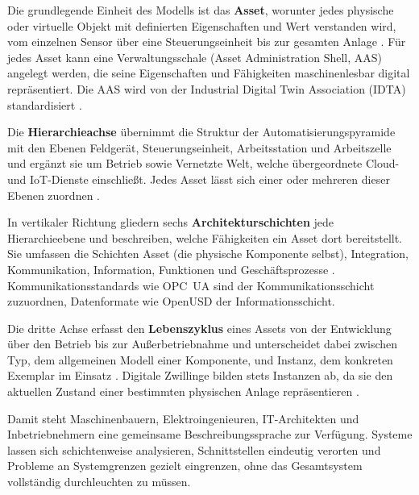 Die grundlegende Einheit des Modells ist das \textbf{Asset}, worunter jedes physische
oder virtuelle Objekt mit definierten Eigenschaften und Wert verstanden wird, vom
einzelnen Sensor über eine Steuerungseinheit bis zur gesamten Anlage \cite{plattformi40_rami40_orientierungsrahmen}.
Für jedes Asset kann eine Verwaltungsschale (Asset Administration Shell, AAS) angelegt
werden, die seine Eigenschaften und Fähigkeiten maschinenlesbar digital repräsentiert. Die AAS wird
von der Industrial Digital Twin Association (IDTA) standardisiert \cite{idta_aas2025}.

Die \textbf{Hierarchieachse} übernimmt die Struktur der Automatisierungspyramide mit
den Ebenen Feldgerät, Steuerungseinheit, Arbeitsstation und Arbeitszelle und ergänzt
sie um Betrieb sowie Vernetzte Welt, welche übergeordnete Cloud- und IoT-Dienste
einschließt. Jedes Asset lässt sich einer oder mehreren dieser Ebenen zuordnen \cite{plattformi40_rami40_orientierungsrahmen}.

In vertikaler Richtung gliedern sechs \textbf{Architekturschichten} jede Hierarchieebene
und beschreiben, welche Fähigkeiten ein Asset dort bereitstellt. Sie umfassen die Schichten Asset (die physische Komponente selbst),
Integration, Kommunikation, Information, Funktionen und Geschäftsprozesse \cite{plattformi40_rami40_orientierungsrahmen}.
Kommunikationsstandards wie OPC~UA sind der Kommunikationsschicht zuzuordnen,
Datenformate wie OpenUSD der Informationsschicht.

Die dritte Achse erfasst den \textbf{Lebenszyklus} eines Assets von der Entwicklung
über den Betrieb bis zur Außerbetriebnahme und unterscheidet dabei zwischen Typ, dem
allgemeinen Modell einer Komponente, und Instanz, dem konkreten Exemplar im Einsatz \cite{plattformi40_rami40_orientierungsrahmen}.
Digitale Zwillinge bilden stets Instanzen ab, da sie den aktuellen Zustand einer
bestimmten physischen Anlage repräsentieren \cite{kritzinger2018}.

Damit steht Maschinenbauern, Elektroingenieuren, IT-Architekten und Inbetriebnehmern
eine gemeinsame Beschreibungssprache zur Verfügung. Systeme lassen sich
schichtenweise analysieren, Schnittstellen eindeutig verorten und Probleme an
Systemgrenzen gezielt eingrenzen, ohne das Gesamtsystem vollständig durchleuchten
zu müssen.

